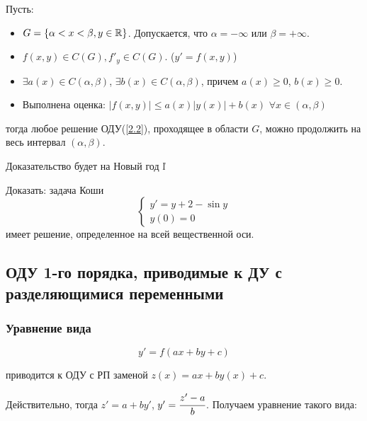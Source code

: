\begin{theorem}  

Пусть: \begin{itemize}
    \item $G = \{\alpha < x < \beta, y \in \mathbb{R}\}$. Допускается, что $\alpha = -\infty$ или $\beta = +\infty$.
    \item $f(x,y) \in C(G), f'_y\in C(G)$. ($y' = f(x,y)$)
    \item $\exists a(x) \in C(\alpha,\beta)$, $\exists b(x) \in C(\alpha,\beta)$, причем $a(x) \geqslant 0$, $b(x) \geqslant 0$.
    \item Выполнена оценка: $\big|f(x,y)\big| \leqslant a(x)|y(x)| + b(x)$ $\forall x \in (\alpha,\beta)$
\end{itemize}

тогда любое решение ОДУ(\ref{2.2}), проходящее в области $G$, можно продолжить на весь интервал $(\alpha,\beta)$.
\end{theorem}

Доказательство будет на Новый год $\Smiley$

\begin{example}\label{ex3.1}
    Доказать: задача Коши
    \begin{equation}
        \begin{cases}
        y' = y+2-\sin y \\
        y(0) = 0
        \end{cases}
    \end{equation} имеет решение, определенное на всей вещественной оси.
\end{example}

\subsection{\large{ОДУ 1-го порядка, приводимые к ДУ с разделяющимися переменными}}

\subsubsection{Уравнение вида}
\begin{equation*}
    y' = f(ax+by+c)
\end{equation*}
\begin{prop}
    приводится к ОДУ с РП заменой $z(x) = ax+by(x)+c.$
\end{prop}

Действительно, тогда $z' = a+by'$, $y' = \cfrac{z'-a}{b}$. Получаем уравнение такого вида:

